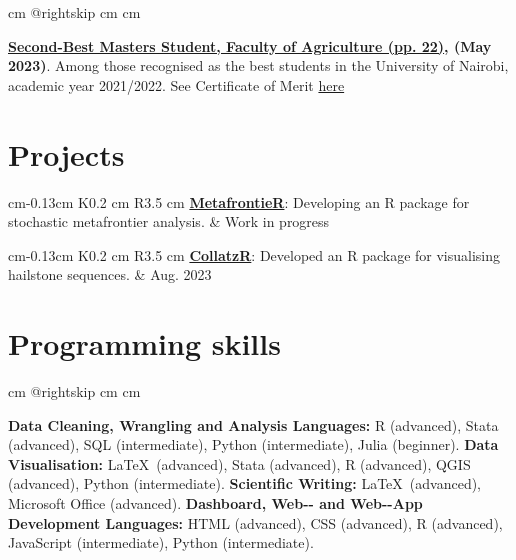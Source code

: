 \documentclass[10pt, letterpaper]{sulmancv}
\begin{document}
        \vspace{0.2 cm}
        \begingroup{} cm
        \advance\csname @rightskip cm
        \advance{} cm

         \textcolor{primaryColor}{\faMedal} \quad \textbf{\href{\detokenize{https://www.uonbi.ac.ke/news/student-recognition-awards-booklet}}{Second-Best Masters Student, Faculty of Agriculture (pp. 22)}, (May 2023)}. Among those recognised as the best students in the University of Nairobi, academic year 2021/2022. See Certificate of Merit \href{\detokenize{https://sulmanolieko.github.io/authors/admin/msc-merit.pdf}}{here} \par\endgroup

    \section{Projects}

        \begin{tabularx}{
             cm-0.13cm
        }{
            K{0.2 cm}
            R{3.5 cm}
        }
           \textcolor{primaryColor}{\faGithub\quad\faCodeBranch}\quad\href{\detokenize{https://github.com/SulmanOlieko/stochastic-metafrontier}}{\textbf{MetafrontieR}}: Developing an R package for stochastic metafrontier analysis.
            &
            Work in progress
        \end{tabularx}

        \begin{tabularx}{
             cm-0.13cm
        }{
            K{0.2 cm}
            R{3.5 cm}
        }
            \textcolor{primaryColor}{\faGithub\quad\faCodeBranch}\quad\href{\detokenize{https://github.com/SulmanOlieko/collatzR}}{\textbf{CollatzR}}: Developed an R package for visualising hailstone sequences.
            &
            Aug. 2023
        \end{tabularx}
    
    \section{Programming skills}

        \begingroup{} cm
        \advance\csname @rightskip cm
        \advance{} cm

        \textcolor{primaryColor}{\faCode}\quad\textbf{Data Cleaning, Wrangling and Analysis Languages:} R (advanced), Stata (advanced), SQL (intermediate), Python (intermediate), Julia (beginner).\quad\textcolor{primaryColor}{\faChartArea}\quad
        \textbf{Data Visualisation:} \LaTeX~(advanced), Stata (advanced), R (advanced), QGIS (advanced), Python (intermediate).\hspace{1.5 cm}\textcolor{primaryColor}{\faMarker}\quad
        \textbf{Scientific Writing:} \LaTeX~(advanced), Microsoft Office (advanced).\quad\textcolor{primaryColor}{\faDesktop}\quad
        \textbf{Dashboard, Web\hyp{-} and Web\hyp{-}App Development Languages:} HTML (advanced), CSS (advanced), R (advanced), JavaScript (intermediate), Python (intermediate). 
        \par\endgroup
\end{document}
